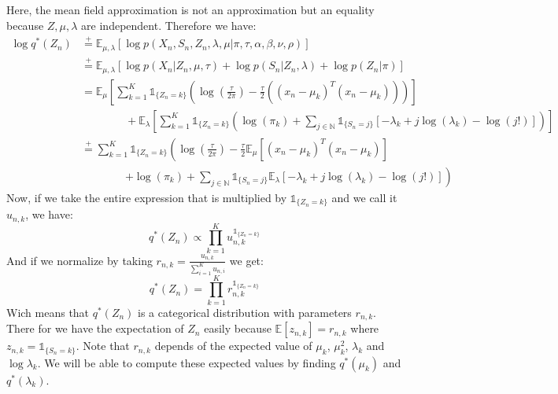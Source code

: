 \documentclass{article}
\begin{document}
Here, the mean field approximation is not an approximation but an equality because $Z, \mu, \lambda$ are independent. Therefore we have:
\begin{equation}
  \begin{split}
    \log q^*(Z_n) & \overset{+}{=} \mathbb{E}_{\mu,\lambda}[\log p(X_n,S_n,Z_n,\lambda,\mu|\pi,\tau,\alpha,\beta,\nu,\rho)]                                                                                                               \\
                  & \overset{+}{=} \mathbb{E}_{\mu,\lambda}[\log p(X_n|Z_n,\mu,\tau) + \log p(S_n|Z_n,\lambda) + \log p(Z_n|\pi)]                                                                                                         \\
                  & = \mathbb{E}_{\mu}\left[\sum_{k=1}^{K}\mathbb{1}_{\{Z_n = k\}}\left(\log \left(\frac{\tau}{2\pi}\right) -\frac{\tau}{2}\left((x_n - \mu_k)^T(x_n - \mu_k)\right)\right)\right]                                        \\
                  & \qquad\qquad + \mathbb{E}_{\lambda}\left[\sum_{k=1}^{K}\mathbb{1}_{\{Z_n = k\}}\left(\log(\pi_k) + \sum_{j \in \mathbb{N}}\mathbb{1}_{\{S_n = j\}}\left[-\lambda_k + j\log(\lambda_k) - \log(j!)\right]\right)\right] \\
                  & \overset{+}{=} \sum_{k=1}^{K}\mathbb{1}_{\{Z_n = k\}}\left(\log \left(\frac{\tau}{2\pi}\right) - \frac{\tau}{2}\mathbb{E}_{\mu}\left[(x_n - \mu_k)^T(x_n - \mu_k)\right] \right.                                      \\
                  & \qquad\qquad \left. + \log(\pi_k) + \sum_{j \in \mathbb{N}}\mathbb{1}_{\{S_n = j\}}\mathbb{E}_{\lambda}\left[-\lambda_k + j\log(\lambda_k) - \log(j!)\right]\right)
  \end{split}
\end{equation}
Now, if we take the entire expression that is multiplied by $\mathbb{1}_{\{Z_n = k\}}$ and we call it $u_{n,k}$, we have:
\begin{equation}
  q^*(Z_n) \propto \prod_{k=1}^{K}u_{n,k}^{\mathbb{1}_{\{Z_n = k\}}}
\end{equation}
And if we normalize by taking $r_{n,k} = \frac{u_{n,k}}{\sum_{i=1}^{K}u_{n,i}}$ we get:
\begin{equation}
  q^*(Z_n) = \prod_{k=1}^{K}r_{n,k}^{\mathbb{1}_{\{Z_n = k\}}}
\end{equation}
Wich means that $q^*(Z_n)$ is a categorical distribution with parameters $r_{n,k}$. There for we have the expectation of $Z_n$ easily because $\mathbb{E}[z_{n,k}] = r_{n,k}$ where $z_{n,k} = \mathbb{1}_{\{S_n = k\}}$. Note that $r_{n,k}$ depends of the expected value of $\mu_k$, $\mu_k^2$, $\lambda_k$ and $\log \lambda_k$. We will be able to compute these expected values by finding $q^*(\mu_k)$ and $q^*(\lambda_k)$.
\end{document}
